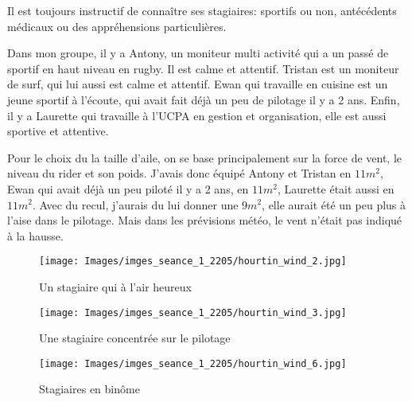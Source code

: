\documentclass[11pt,a4paper]{report}
\begin{document}
Il est toujours instructif de connaître ses stagiaires: 
sportifs ou non, antécédents médicaux ou des appréhensions particulières.

Dans mon groupe, il y a Antony, un moniteur multi activité qui a un passé 
de sportif en haut niveau en rugby. Il est calme et attentif.
Tristan est un moniteur de surf, qui lui aussi est calme et attentif.
Ewan qui travaille en cuisine est un jeune sportif à l'écoute, qui avait 
fait déjà un peu de pilotage il y a 2 ans.
Enfin, il y a Laurette qui travaille à l'UCPA en gestion et 
organisation, elle est aussi  sportive et attentive.

Pour le choix du la taille d'aile, on se base principalement sur la force
de vent, le niveau du rider et son poids. J'avais donc équipé Antony et Tristan
en $11 m^2$, Ewan qui avait déjà un peu piloté il y a 2 ans, en $11 m^2$,
 Laurette était aussi en $11 m^2$.
Avec du recul, j'aurais du lui donner une  $9 m^2$, elle aurait été un peu plus
à l'aise dans le pilotage. Mais dans les prévisions météo, le vent n'était pas
indiqué à la hausse.

\begin{figure}
\begin{minipage}{0.4\textwidth}
\texttt{[image: Images/imges\_seance\_1\_2205/hourtin\_wind\_2.jpg]} 
\caption{Un stagiaire qui à l'air heureux}
\end{minipage}
\hfill
\begin{minipage}{0.4\textwidth}
\texttt{[image: Images/imges\_seance\_1\_2205/hourtin\_wind\_3.jpg]} 
\caption{Une stagiaire concentrée sur le pilotage}
\end{minipage}
\end{figure}

\begin{figure}
\texttt{[image: Images/imges\_seance\_1\_2205/hourtin\_wind\_6.jpg]}
\caption{Stagiaires en bin\^ome} 
\end{figure}
\end{document}
